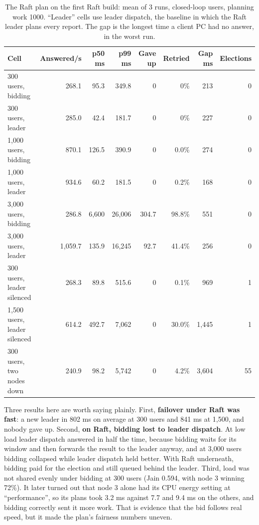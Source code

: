 \begin{table}[!htb]
\centering\small
\caption{The Raft plan on the first Raft build: mean of 3 runs, closed-loop users, planning work 1000. ``Leader'' cells use leader dispatch, the baseline in which the Raft leader plans every report. The gap is the longest time a client PC had no answer, in the worst run.}
\label{tab:raftplan}
\begin{tabular}{@{}lrrrrrrr@{}}
\toprule
Cell & Answered/s & p50 ms & p99 ms & Gave up & Retried & Gap ms & Elections \\
\midrule
300 users, bidding & 268.1 & 95.3 & 349.8 & 0 & 0\% & 213 & 0 \\
300 users, leader & 285.0 & 42.4 & 181.7 & 0 & 0\% & 227 & 0 \\
1,000 users, bidding & 870.1 & 126.5 & 390.9 & 0 & 0.0\% & 274 & 0 \\
1,000 users, leader & 934.6 & 60.2 & 181.5 & 0 & 0.2\% & 168 & 0 \\
3,000 users, bidding & 286.8 & 6,600 & 26,006 & 304.7 & 98.8\% & 551 & 0 \\
3,000 users, leader & 1,059.7 & 135.9 & 16,245 & 92.7 & 41.4\% & 256 & 0 \\
300 users, leader silenced & 268.3 & 89.8 & 515.6 & 0 & 0.1\% & 969 & 1 \\
1,500 users, leader silenced & 614.2 & 492.7 & 7,062 & 0 & 30.0\% & 1,445 & 1 \\
300 users, two nodes down & 240.9 & 98.2 & 5,742 & 0 & 4.2\% & 3,604 & 55 \\
\bottomrule
\end{tabular}
\end{table}

Three results here are worth saying plainly. First, \textbf{failover under Raft was fast}: a new leader in 802 ms on average at 300 users and 841 ms at 1,500, and nobody gave up. Second, \textbf{on Raft, bidding lost to leader dispatch}. At low load leader dispatch answered in half the time, because bidding waits for its window and then forwards the result to the leader anyway, and at 3,000 users bidding collapsed while leader dispatch held better. With Raft underneath, bidding paid for the election and still queued behind the leader. Third, load was not shared evenly under bidding at 300 users (Jain 0.594, with node 3 winning 72\%). It later turned out that node 3 alone had its CPU energy setting at ``performance'', so its plans took 3.2 ms against 7.7 and 9.4 ms on the others, and bidding correctly sent it more work. That is evidence that the bid follows real speed, but it made the plan's fairness numbers uneven.

